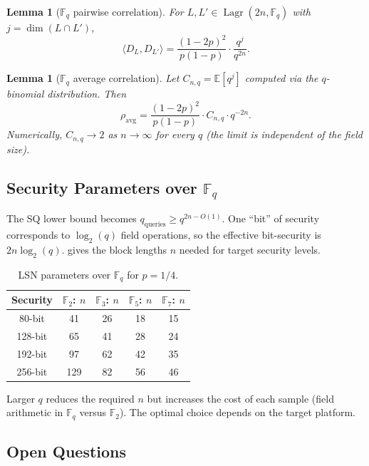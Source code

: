 \documentclass[11pt,a4paper]{article}
\theoremstyle{plain}
\newtheorem{lemma}[theorem]{Lemma}
\theoremstyle{definition}
\newcommand{\F}{\mathbb{F}}
\newcommand{\E}{\mathbb{E}}
\DeclareMathOperator{\Lagr}{Lagr}
\begin{document}
\begin{lemma}[$\F_q$ pairwise correlation]
\label{lem:fq-corr}
For $L,L' \in \Lagr(2n,\F_q)$ with $j = \dim(L \cap L')$,
\[
\langle D_L, D_{L'} \rangle = \frac{(1-2p)^2}{p(1-p)} \cdot \frac{q^j}{q^{2n}}.
\]
\end{lemma}

\begin{lemma}[$\F_q$ average correlation]
\label{lem:fq-avg}
Let $C_{n,q} = \E[q^j]$ computed via the $q$-binomial distribution. Then
\[
\rho_{\mathrm{avg}} = \frac{(1-2p)^2}{p(1-p)} \cdot C_{n,q} \cdot q^{-2n}.
\]
Numerically, $C_{n,q} \to 2$ as $n \to \infty$ for every $q$ (the limit is independent of the field size).
\end{lemma}

\subsection{Security Parameters over $\F_q$}
\label{subsec:fq-params}

The SQ lower bound becomes $q_{\mathrm{queries}} \geq q^{2n-O(1)}$. One ``bit'' of security corresponds to $\log_2(q)$ field operations, so the effective bit-security is $2n \log_2(q)$.  gives the block lengths $n$ needed for target security levels.

\begin{table}[ht]
\centering
\caption{LSN parameters over $\F_q$ for $p=1/4$.}
\label{tab:fq-params}
\begin{tabular}{@{}ccccc@{}}
\hline
Security & $\F_2$: $n$ & $\F_3$: $n$ & $\F_5$: $n$ & $\F_7$: $n$ \\
\hline
80-bit  & 41  & 26 & 18 & 15 \\
128-bit & 65  & 41 & 28 & 24 \\
192-bit & 97  & 62 & 42 & 35 \\
256-bit & 129 & 82 & 56 & 46 \\
\hline
\end{tabular}
\end{table}

Larger $q$ reduces the required $n$ but increases the cost of each sample (field arithmetic in $\F_q$ versus $\F_2$). The optimal choice depends on the target platform.

\subsection{Open Questions}
\label{subsec:fq-open}
\end{document}
